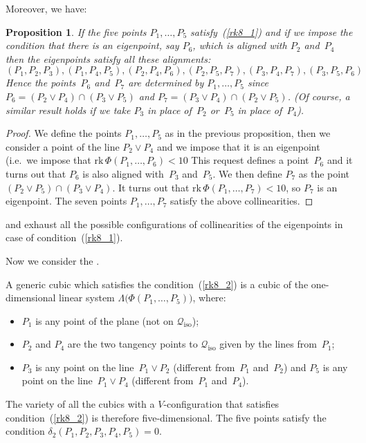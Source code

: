 \documentclass[a4paper, 11pt, reqno]{amsart}
\theoremstyle{plain}
\newtheorem{prop}[lemma]{Proposition}
\theoremstyle{definition}
\newcommand{\rk}{\ensuremath{\mathrm{rk}}}
\newcommand{\iso}{\mathcal{Q}_{\mathrm{iso}}}
\begin{document}
%
Moreover, we have:
%
\begin{prop}
\label{prop:d2_6allin}
If the five points $P_1, \dots, P_5$ satisfy~(\ref{rk8_1})
and if we impose the condition that there is an eigenpoint, say $P_6$,
which is aligned with $P_2$ and~$P_4$ then the eigenpoints satisfy all these
alignments:
%
\[
  (P_1, P_2, P_3), (P_1, P_4, P_5),
  (P_2, P_4, P_6), (P_2, P_5, P_7),
  (P_3, P_4, P_7), (P_3, P_5, P_6)
\]
%
Hence the points~$P_6$ and~$P_7$ are determined by $P_1, \dots, P_5$
since
$P_6 = (P_2 \vee P_4) \cap (P_3 \vee P_5)$
and $P_7 = (P_3 \vee P_4) \cap (P_2 \vee P_5)$.
(Of course, a similar result holds if we take $P_3$ in place of~$P_2$ or~$P_5$
in place of~$P_4$).
\end{prop}
%
\begin{proof}
We define the points $P_1, \dots, P_5$ as in the previous proposition, then 
we consider a point of the line $P_2 \vee P_4$ and we impose that it is 
an eigenpoint (i.e.\ we impose that $\rk \, \Phi(P_1, \dotsc, P_6) < 10$
This request defines a point~$P_6$ and it turns out that $P_6$ is also aligned 
with~$P_3$ and~$P_5$. We then define $P_7$ as the point 
$(P_2 \vee P_5) \cap (P_3 \vee P_4)$. It turns out that 
$\rk \, \Phi(P_1, \dots, P_7) < 10$, so $P_7$ is an eigenpoint. The seven 
points $P_1, \dotsc, P_7$ satisfy the above collinearities.
\end{proof}
 and  exhaust all the possible configurations
of collinearities of the eigenpoints in case of condition~(\ref{rk8_1}).

%

Now we consider the .

%
A generic cubic which satisfies the condition~(\ref{rk8_2}) is
a cubic of the one-dimensional linear system
$\Lambda\bigl(\Phi(P_1, \dotsc, P_5)\bigr)$, where:
%
\begin{itemize}
  \item $P_1$ is any point of the plane (not on $\iso$);
  \item $P_2$ and $P_4$ are the two tangency points to $\iso$ given by the lines from~$P_1$;
  \item $P_3$ is any point on the line~$P_1 \vee P_2$ (different from~$P_1$ and~$P_2$)
  and $P_5$ is any point on the line~$P_1 \vee P_4$ (different from~$P_1$ and~$P_4$).
\end{itemize}
%
The variety of all the cubics with a $V$-configuration
that satisfies condition~(\ref{rk8_2}) is therefore five-dimensional.
The five points satisfy the condition $\delta_2(P_1, P_2, P_3, P_4, P_5) = 0$.
\end{document}
